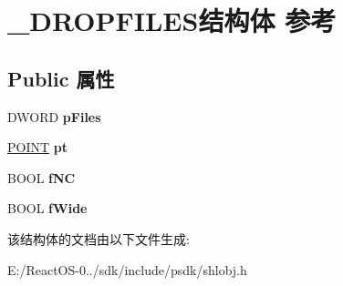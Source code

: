 \hypertarget{struct___d_r_o_p_f_i_l_e_s}{}\section{\+\_\+\+D\+R\+O\+P\+F\+I\+L\+E\+S结构体 参考}
\label{struct___d_r_o_p_f_i_l_e_s}
\subsection*{Public 属性}
\begin{DoxyCompactItemize}
\item 
\mbox{\label{struct___d_r_o_p_f_i_l_e_s_a0ff9312911866cce32aa0b986c10866a}} 
D\+W\+O\+RD {\bfseries p\+Files}
\item 
\mbox{\label{struct___d_r_o_p_f_i_l_e_s_ab0d948586089f129db1a385c1f28e463}} 
\hyperlink{structtag_p_o_i_n_t}{P\+O\+I\+NT} {\bfseries pt}
\item 
\mbox{\label{struct___d_r_o_p_f_i_l_e_s_a0811b925295c1b9e869a876a354f7a33}} 
B\+O\+OL {\bfseries f\+NC}
\item 
\mbox{\label{struct___d_r_o_p_f_i_l_e_s_a1cd9530fffed0fa8bfac3305fc569697}} 
B\+O\+OL {\bfseries f\+Wide}
\end{DoxyCompactItemize}


该结构体的文档由以下文件生成\+:\begin{DoxyCompactItemize}
\item 
E\+:/\+React\+O\+S-\/0../sdk/include/psdk/shlobj.\+h\end{DoxyCompactItemize}
